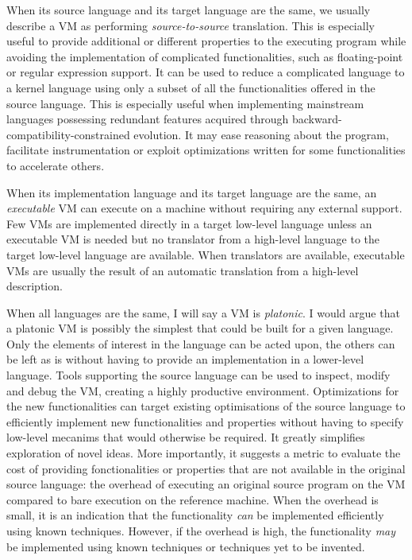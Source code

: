 When its source language and its target language are the same, we usually
describe a VM as performing \textit{source-to-source} translation. This is
especially useful to provide additional or different properties to the
executing program while avoiding the implementation of complicated
functionalities, such as floating-point or regular expression support.  It can
be used to reduce a complicated language to a kernel language using only a
subset of all the functionalities offered in the source language. This is
especially useful when implementing mainstream languages possessing redundant
features acquired through backward-compatibility-constrained evolution. It may
ease reasoning about the program, facilitate instrumentation or exploit
optimizations written for some functionalities to accelerate others.

When its implementation language and its target language are the same, an
\textit{executable} VM can execute on a machine without requiring any external
support. Few VMs are implemented directly in a target low-level language unless
an executable VM is needed but no translator from a high-level language to the
target low-level language are available. When translators are available,
executable VMs are usually the result of an automatic translation from a high-level
description.

When all languages are the same, I will say a VM is \textit{platonic}.  I would
argue that a platonic VM is possibly the simplest that could be built for a
given language. Only the elements of interest in the language can be acted
upon, the others can be left as is without having to provide an implementation
in a lower-level language.  Tools supporting the source language can be used to
inspect, modify and debug the VM, creating a highly productive environment.
Optimizations for the new functionalities can target existing optimisations of
the source language to efficiently implement new functionalities and properties
without having to specify low-level mecanims that would otherwise be required.
It greatly simplifies exploration of novel ideas. More importantly, it suggests
a metric to evaluate the cost of providing fonctionalities or properties that
are not available in the original source language: the overhead of executing an
original source program on the VM compared to bare execution on the reference
machine. When the overhead is small, it is an indication that the functionality
\textit{can} be implemented efficiently using known techniques. However, if the
overhead is high, the functionality \textit{may} be implemented using known
techniques or techniques yet to be invented.

